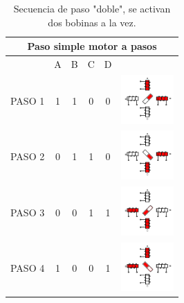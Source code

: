 \begin{table}
	\centering
	\caption{Secuencia de paso "doble", se activan dos bobinas a la vez. \cite{BasicStepper}}
	\label{tabla:pasoDoble}
		\begin{tabular}{|c|c|c|c|c|c|}
			\hline 
			\multicolumn{6}{|c|}{Paso simple motor a pasos} \\ 
			\hline 
			& \hspace{5mm} A \hspace{5mm} & \hspace{5mm} B \hspace{5mm} & \hspace{5mm} C \hspace{5mm} & \hspace{5mm} D \hspace{5mm} & \\ 
			\hline 
			PASO 1  & 1 & 1 & 0 & 0 &\includegraphics[width=20mm]{Imagenes/2/paso1_5} \\ 
			\hline 
			PASO 2 & 0 & 1 & 1 & 0 & \includegraphics[width=20mm]{Imagenes/2/paso2_5} \\ 
			\hline 
			PASO 3 & 0 & 0 & 1 & 1 & \includegraphics[width=20mm]{Imagenes/2/paso3_5} \\ 
			\hline 
			PASO 4 & 1 & 0 & 0 & 1 & \includegraphics[width=20mm]{Imagenes/2/paso4_5} \\ 
			\hline 
		\end{tabular} 
\end{table}

